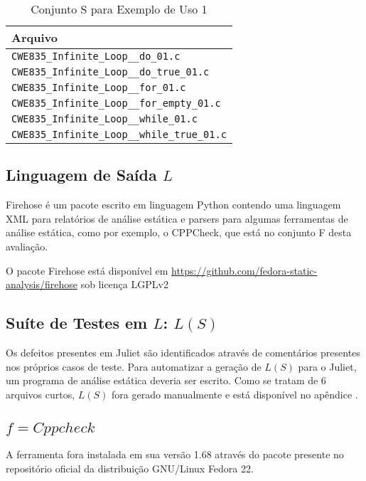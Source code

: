\begin{table}
\caption{Conjunto S para Exemplo de Uso 1}
  \centering
\begin{tabular}{l}
  \hline
  \textbf{Arquivo} \\ \hline
  \lstinline!CWE835_Infinite_Loop__do_01.c! \\ 
  \lstinline!CWE835_Infinite_Loop__do_true_01.c! \\ 
  \lstinline!CWE835_Infinite_Loop__for_01.c! \\ 
  \lstinline!CWE835_Infinite_Loop__for_empty_01.c! \\ 
  \lstinline!CWE835_Infinite_Loop__while_01.c! \\ 
  \lstinline!CWE835_Infinite_Loop__while_true_01.c! \\ \hline
\end{tabular}
\label{tabela_S_eu1}
\end{table}

\subsection{Linguagem de Saída $L$}

Firehose é um pacote escrito em linguagem Python contendo uma linguagem XML para relatórios de análise estática e parsers para algumas ferramentas de análise estática, como por exemplo, o CPPCheck, que está no conjunto F desta avaliação.

O pacote Firehose está disponível em \url{https://github.com/fedora-static-analysis/firehose} sob licença LGPLv2

\subsection{Suíte de Testes em $L$: $L(S)$}

Os defeitos presentes em Juliet são identificados através de comentários presentes nos próprios casos de teste. Para automatizar a geração de $L(S)$ para o Juliet, um programa de análise estática deveria ser escrito. Como se tratam de 6 arquivos curtos, $L(S)$ fora gerado manualmente e está disponível no apêndice .

\subsection{$f = Cppcheck$}

A ferramenta fora instalada em sua versão 1.68 através do pacote presente no repositório oficial da distribuição GNU/Linux Fedora 22.

